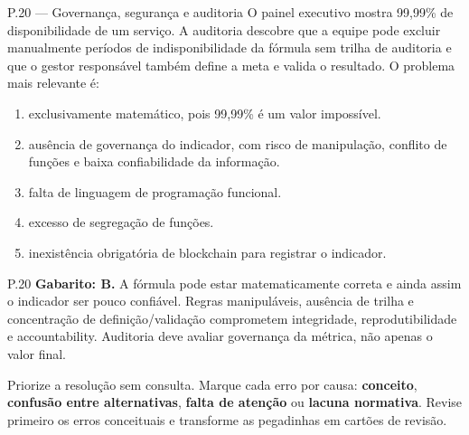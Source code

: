 \begin{questao}{ P.20 — Governança, segurança e auditoria}
O painel executivo mostra 99,99\% de disponibilidade de um serviço. A auditoria descobre que a equipe pode excluir manualmente períodos de indisponibilidade da fórmula sem trilha de auditoria e que o gestor responsável também define a meta e valida o resultado. O problema mais relevante é:
\begin{enumerate}[label=\Alph*)]
\item exclusivamente matemático, pois 99,99\% é um valor impossível.
\item ausência de governança do indicador, com risco de manipulação, conflito de funções e baixa confiabilidade da informação.
\item falta de linguagem de programação funcional.
\item excesso de segregação de funções.
\item inexistência obrigatória de blockchain para registrar o indicador.
\end{enumerate}
\end{questao}
\begin{solucao}{P.20}
\textbf{Gabarito: B.} A fórmula pode estar matematicamente correta e ainda assim o indicador ser pouco confiável. Regras manipuláveis, ausência de trilha e concentração de definição/validação comprometem integridade, reprodutibilidade e accountability. Auditoria deve avaliar governança da métrica, não apenas o valor final.
\end{solucao}

\begin{resumo}
Priorize a resolução sem consulta. Marque cada erro por causa: \textbf{conceito}, \textbf{confusão entre alternativas}, \textbf{falta de atenção} ou \textbf{lacuna normativa}. Revise primeiro os erros conceituais e transforme as pegadinhas em cartões de revisão.
\end{resumo}
